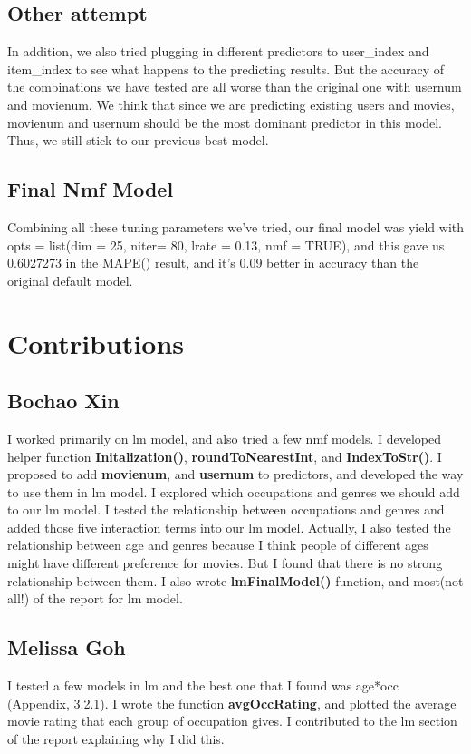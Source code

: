 \documentclass[11pt]{article}
\newcommand\tab[1][0.5cm]{\hspace*{#1}}
\begin{document}
\subsection{Other attempt}
\tab{}In addition, we also tried plugging in different predictors to user\_index and item\_index to see what happens to the predicting results. But the accuracy of the combinations we have tested are all worse than the original one with usernum and movienum. We think that since we are predicting existing users and movies, movienum and usernum should be the most dominant predictor in this model. Thus, we still stick to our previous best model.

\subsection{Final Nmf Model}
\tab{}Combining all these tuning parameters we've tried, our final model was yield with opts = list(dim = 25, niter= 80, lrate = 0.13, nmf = TRUE), and this gave us 0.6027273 in the MAPE() result, and it's 0.09 better in accuracy than the original default model.


\section{Contributions}
\subsection{Bochao Xin}
I worked primarily on lm model, and also tried a few nmf models. I 
developed helper function \textbf{Initalization()}, 
\textbf{roundToNearestInt}, and \textbf{IndexToStr()}. I proposed 
to add \textbf{movienum}, and \textbf{usernum} to predictors, and 
developed the way to use them in lm model. I explored which 
occupations and genres we should add to our lm model. I tested the 
relationship between occupations and genres and added those five 
interaction terms into our lm model. Actually, I also tested the 
relationship between age and genres because I think people of 
different ages might have different preference for movies. But I
found that there is no strong relationship between them.
I also wrote \textbf{lmFinalModel()} function, and most(not all!) of the report for lm model.

\subsection{Melissa Goh}
I tested a few models in lm and the best one that I found was 
age*occ (Appendix, 3.2.1). I wrote the function \textbf{avgOccRating},
and plotted the average movie rating that each group of occupation gives.
I contributed to the lm section of the report explaining why I did this.
\end{document}
